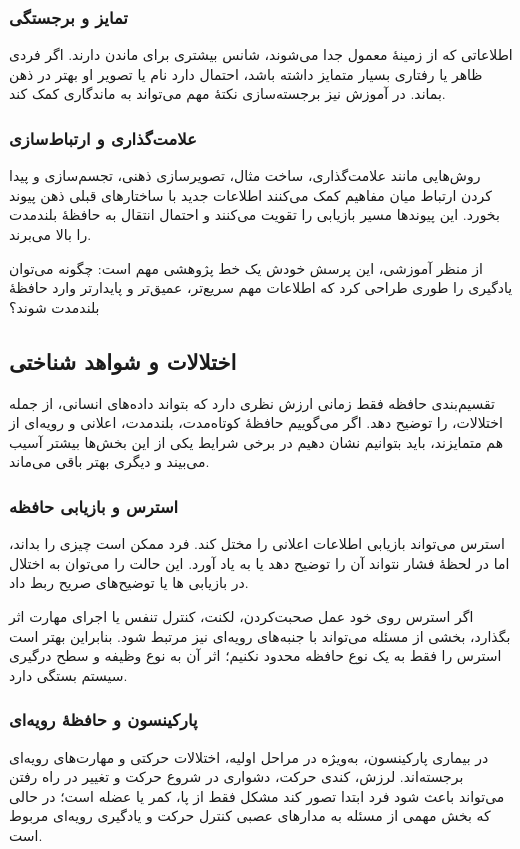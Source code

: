 \subsubsection{تمایز و برجستگی}
اطلاعاتی که از زمینهٔ معمول جدا می‌شوند، شانس بیشتری برای ماندن دارند. اگر فردی ظاهر یا رفتاری بسیار متمایز داشته باشد، احتمال دارد نام یا تصویر او بهتر در ذهن بماند. در آموزش نیز برجسته‌سازی نکتهٔ مهم می‌تواند به ماندگاری کمک کند.

\subsubsection{علامت‌گذاری و ارتباط‌سازی}
روش‌هایی مانند علامت‌گذاری، ساخت مثال، تصویرسازی ذهنی، تجسم‌سازی و پیدا کردن ارتباط میان مفاهیم کمک می‌کنند اطلاعات جدید با ساختارهای قبلی ذهن پیوند بخورد. این پیوندها مسیر بازیابی را تقویت می‌کنند و احتمال انتقال به حافظهٔ بلندمدت را بالا می‌برند.

از منظر آموزشی، این پرسش خودش یک خط پژوهشی مهم است: چگونه می‌توان یادگیری را طوری طراحی کرد که اطلاعات مهم سریع‌تر، عمیق‌تر و پایدارتر وارد حافظهٔ بلندمدت شوند؟

\subsection{اختلالات و شواهد شناختی}
تقسیم‌بندی حافظه فقط زمانی ارزش نظری دارد که بتواند داده‌های انسانی، از جمله اختلالات، را توضیح دهد. اگر می‌گوییم حافظهٔ کوتاه‌مدت، بلندمدت، اعلانی و رویه‌ای از هم متمایزند، باید بتوانیم نشان دهیم در برخی شرایط یکی از این بخش‌ها بیشتر آسیب می‌بیند و دیگری بهتر باقی می‌ماند.

\subsubsection{استرس و بازیابی حافظه}
استرس می‌تواند بازیابی اطلاعات اعلانی را مختل کند. فرد ممکن است چیزی را بداند، اما در لحظهٔ فشار نتواند آن را توضیح دهد یا به یاد آورد. این حالت را می‌توان به اختلال در بازیابی ها یا توضیح‌های صریح ربط داد.

اگر استرس روی خود عمل صحبت‌کردن، لکنت، کنترل تنفس یا اجرای مهارت اثر بگذارد، بخشی از مسئله می‌تواند با جنبه‌های رویه‌ای نیز مرتبط شود. بنابراین بهتر است استرس را فقط به یک نوع حافظه محدود نکنیم؛ اثر آن به نوع وظیفه و سطح درگیری سیستم بستگی دارد.

\subsubsection{پارکینسون و حافظهٔ رویه‌ای}
در بیماری پارکینسون، به‌ویژه در مراحل اولیه، اختلالات حرکتی و مهارت‌های رویه‌ای برجسته‌اند. لرزش، کندی حرکت، دشواری در شروع حرکت و تغییر در راه رفتن می‌تواند باعث شود فرد ابتدا تصور کند مشکل فقط از پا، کمر یا عضله است؛ در حالی که بخش مهمی از مسئله به مدارهای عصبی کنترل حرکت و یادگیری رویه‌ای مربوط است.

